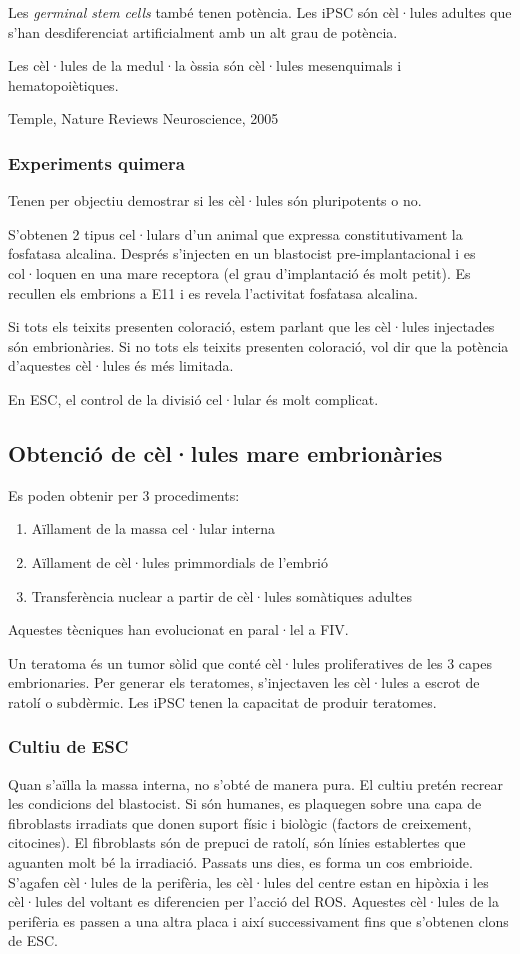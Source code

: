 Les \textit{germinal stem cells} també tenen potència. Les iPSC són cèl·lules adultes que s'han desdiferenciat artificialment amb un alt grau de potència.

Les cèl·lules de la medul·la òssia són cèl·lules mesenquimals i hematopoiètiques.

Temple, Nature Reviews Neuroscience, 2005

\subsubsection{Experiments quimera}
Tenen per objectiu demostrar si les cèl·lules són pluripotents o no.

S'obtenen 2 tipus cel·lulars d'un animal que expressa constitutivament la fosfatasa alcalina. Després s'injecten en un blastocist pre-implantacional i es col·loquen en una mare receptora (el grau d'implantació és molt petit). Es recullen els embrions a E11 i es revela l'activitat fosfatasa alcalina.

Si tots els teixits presenten coloració, estem parlant que les cèl·lules injectades són embrionàries.
Si no tots els teixits presenten coloració, vol dir que la potència d'aquestes cèl·lules és més limitada.

En ESC, el control de la divisió cel·lular és molt complicat.

\subsection{Obtenció de cèl·lules mare embrionàries}
Es poden obtenir per 3 procediments:
\begin{enumerate}
\item Aïllament de la massa cel·lular interna
\item Aïllament de cèl·lules primmordials de l'embrió
\item Transferència nuclear a partir de cèl·lules somàtiques adultes
\end{enumerate}

Aquestes tècniques han evolucionat en paral·lel a FIV.

Un teratoma és un tumor sòlid que conté cèl·lules proliferatives de les 3 capes embrionaries. Per generar els teratomes, s'injectaven les cèl·lules a escrot de ratolí o subdèrmic. Les iPSC tenen la capacitat de produir teratomes.

\subsubsection{Cultiu de ESC}
Quan s'aïlla la massa interna, no s'obté de manera pura. El cultiu pretén recrear les condicions del blastocist. Si són humanes, es plaquegen sobre una capa de fibroblasts irradiats que donen suport físic i biològic (factors de creixement, citocines). El fibroblasts són de prepuci de ratolí, són línies establertes que aguanten molt bé la irradiació. Passats uns dies, es forma un cos embrioide. S'agafen cèl·lules de la perifèria, les cèl·lules del centre estan en hipòxia i les cèl·lules del voltant es diferencien per l'acció del ROS. Aquestes cèl·lules de la perifèria es passen a una altra placa i així successivament fins que s'obtenen clons de ESC.

